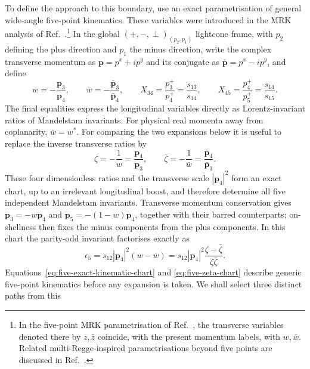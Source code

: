 \documentclass[a4paper,11pt]{article}
\begin{document}
To define the approach to this boundary, use an exact parametrisation of
general wide-angle five-point kinematics.  These variables were introduced
in the MRK analysis of
Ref.~\cite{Abreu:2024xoh}.\footnote{In the
five-point MRK parametrisation of Ref.~\cite{Caron-Huot:2020vlo}, the
transverse variables denoted there by \(z,\bar z\) coincide, with the present
momentum labels, with \(w,\bar w\).  Related multi-Regge-inspired
parametrisations beyond five points are discussed in
Ref.~\cite{Byrne:2025phh}.}  In the global
\((+,-,\perp)_{(p_2,p_1)}\) lightcone frame, with $p_2$ defining the plus
direction and $p_1$ the minus direction, write the complex transverse momentum as
\(\mathbf p=p^x+ip^y\) and its conjugate as
\(\bar{\mathbf p}=p^x-ip^y\), and define
\begin{equation}
 w=-\frac{\mathbf p_3}{\mathbf p_4},\qquad
 \bar w=-\frac{\bar{\mathbf p}_3}{\bar{\mathbf p}_4},\qquad
 X_{34}=\frac{p_3^+}{p_4^+}=\frac{s_{13}}{s_{14}},\qquad
 X_{45}=\frac{p_4^+}{p_5^+}=\frac{s_{14}}{s_{15}}.
 \label{eq:five-exact-kinematic-chart}
\end{equation}
The final equalities express the longitudinal variables directly as
Lorentz-invariant ratios of Mandelstam invariants.
For physical real momenta away from coplanarity, \(\bar w=w^*\).
For comparing the two expansions below it is useful to replace the inverse
transverse ratios by
\begin{equation}
 \zeta=-\frac1w=\frac{\mathbf p_4}{\mathbf p_3},\qquad
 \bar\zeta=-\frac1{\bar w}
 =\frac{\bar{\mathbf p}_4}{\bar{\mathbf p}_3}.
 \label{eq:five-zeta-chart}
\end{equation}
These four dimensionless ratios and the transverse scale
\(|\mathbf p_4|^2\) form an exact chart, up to an irrelevant longitudinal
boost, and therefore determine all five independent Mandelstam invariants.
Transverse momentum
conservation gives
\(\mathbf p_3=-w\mathbf p_4\) and
\(\mathbf p_5=-(1-w)\mathbf p_4\), together with their barred counterparts;
on-shellness then fixes the minus components from the plus components.  In
this chart the parity-odd invariant factorises exactly as
\begin{equation}
 \epsilon_5=s_{12}|\mathbf p_4|^2(w-\bar w)
 =s_{12}|\mathbf p_4|^2
  \frac{\zeta-\bar\zeta}{\zeta\bar\zeta}.
 \label{eq:five-exact-parity-odd-chart}
\end{equation}
Equations~\eqref{eq:five-exact-kinematic-chart} and
\eqref{eq:five-zeta-chart} describe generic five-point kinematics before
any expansion is taken.  We shall select three distinct paths from this
\end{document}
